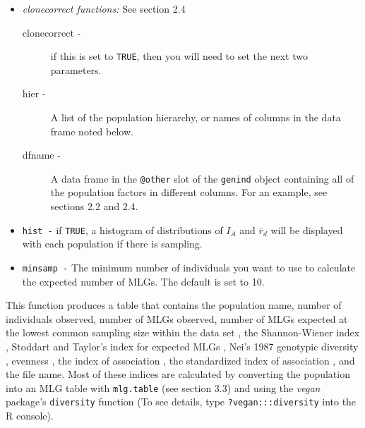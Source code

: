 \documentclass[letterpaper]{article}
\begin{document}
\begin{itemize}
  \item \emph{clonecorrect functions:} See section 2.4
  \begin{description}
    \item[clonecorrect -] if this is set to \texttt{TRUE}, then you will need to set the next two parameters.
    \item[hier -] A list of the population hierarchy, or names of columns in the data frame noted below.
    \item[dfname -] A data frame in the \texttt{@other} slot of the \texttt{genind} object containing all of the population factors in different columns. For an example, see sections 2.2 and 2.4.
  \end{description}
  \item \texttt{hist -} if \texttt{TRUE}, a histogram of distributions of $I_A$ and $\bar r_d$ will be displayed with each population if there is sampling.
  \item \texttt{minsamp -} The minimum number of individuals you want to use to calculate the expected number of MLGs. The default is set to 10.
\end{itemize}

This function produces a table that contains the population name, number of individuals observed, number of MLGs observed, number of MLGs expected at the lowest common sampling size within the data set \cite{Hurlbert:1971} \cite{Heck:1975}, the Shannon-Wiener index \cite{Shannon:1948}, Stoddart and Taylor's index for expected MLGs \cite{Stoddart:1988}, Nei's 1987 genotypic diversity \cite{Nei:1978}, evenness \cite{Pielou:1975}\cite{Ludwig:1988}\cite{Grunwald:2003}, the index of association \cite{Brown:1980}\cite{Smith:1993}, the standardized index of association \cite{Agapow:2001}, and the file name. Most of these indices are calculated by converting the population into an MLG table with \texttt{mlg.table} (see section 3.3) and using the \textit{vegan} package's \texttt{diversity} function (To see details, type \texttt{?vegan:::diversity} into the R console).
\end{document}
